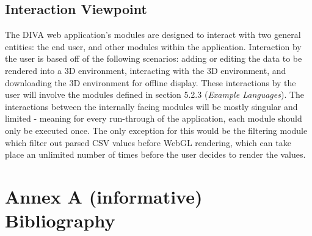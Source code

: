 \documentclass[journal,10pt,onecolumn,compsoc]{IEEEtran} \usepackage[margin=1.0in]{geometry} \usepackage{pdfpages}
\begin{document}
    \subsection{Interaction Viewpoint}
    The DIVA web application's modules are designed to interact with two general entities: the end user, and other modules within the application. Interaction by the user is based off of the following scenarios: adding or editing the data to be rendered into a 3D environment, interacting with the 3D environment, and downloading the 3D environment for offline display. These interactions by the user will involve the modules defined in section 5.2.3 (\textit{Example Languages}). The interactions between the internally facing modules will be mostly singular and limited - meaning for every run-through of the application, each module should only be executed once. The only exception for this would be the filtering module which filter out parsed CSV values before WebGL rendering, which can take place an unlimited number of times before the user decides to render the values. 
    

\newpage
\section*{Annex A (informative) Bibliography}
\begingroup
\renewcommand{\section}[2]{}


\endgroup

\end{document}
